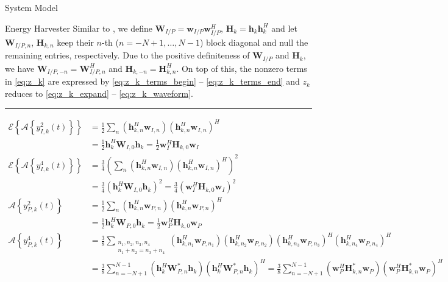 \documentclass{IEEEtran}
\begin{document}
\begin{section}{System Model}
\begin{subsection}{Energy Harvester}
		Similar to \cite{Huang2017}, we define $\boldsymbol{W}_{I/P}=\boldsymbol{w}_{I/P}\boldsymbol{w}_{I/P}^H$, $\boldsymbol{H}_k=\boldsymbol{h}_k\boldsymbol{h}_k^H$ and let $\boldsymbol{W}_{I/P,n}$, $\boldsymbol{H}_{k,n}$ keep their $n$-th ($n=-N+1,\dots,N-1$) block diagonal and null the remaining entries, respectively. Due to the positive definiteness of $\boldsymbol{W}_{I/P}$ and $\boldsymbol{H}_k$, we have $\boldsymbol{W}_{I/P,-n}=\boldsymbol{W}_{I/P,n}^H$ and $\boldsymbol{H}_{k,-n}=\boldsymbol{H}_{k,n}^H$. On top of this, the nonzero terms in \ref{eq:z_k} are expressed by \ref{eq:z_k_terms_begin} -- \ref{eq:z_k_terms_end} and $z_k$ reduces to \ref{eq:z_k_expand} -- \ref{eq:z_k_waveform}.
		\begin{figure*}[b]
			\hrule
			\begin{align}
				\mathcal{E}\left\{\mathcal{A}\left\{y_{I,k}^2(t)\right\}\right\}
				& = \frac{1}{2}\sum_n{(\boldsymbol{h}_{k,n}^H\boldsymbol{w}_{I,n})(\boldsymbol{h}_{k,n}^H\boldsymbol{w}_{I,n})^H}\label{eq:z_k_terms_begin}\\
				& = \frac{1}{2}\boldsymbol{h}_k^H\boldsymbol{W}_{I,0}\boldsymbol{h}_k = \frac{1}{2}\boldsymbol{w}_I^H\boldsymbol{H}_{k,0}\boldsymbol{w}_I\\
				\mathcal{E}\left\{\mathcal{A}\left\{y_{I,k}^4(t)\right\}\right\}
				& = \frac{3}{4}\left(\sum_n{(\boldsymbol{h}_{k,n}^H\boldsymbol{w}_{I,n})(\boldsymbol{h}_{k,n}^H\boldsymbol{w}_{I,n})^H}\right)^2\\
				& = \frac{3}{4}(\boldsymbol{h}_k^H\boldsymbol{W}_{I,0}\boldsymbol{h}_k)^2 = \frac{3}{4}(\boldsymbol{w}_I^H\boldsymbol{H}_{k,0}\boldsymbol{w}_I)^2\\
				\mathcal{A}\left\{y_{P,k}^2(t)\right\}
				& = \frac{1}{2}\sum_n{(\boldsymbol{h}_{k,n}^H\boldsymbol{w}_{P,n})(\boldsymbol{h}_{k,n}^H\boldsymbol{w}_{P,n})^H}\\
				& = \frac{1}{2}\boldsymbol{h}_k^H\boldsymbol{W}_{P,0}\boldsymbol{h}_k = \frac{1}{2}\boldsymbol{w}_P^H\boldsymbol{H}_{k,0}\boldsymbol{w}_P\\
				\mathcal{A}\left\{y_{P,k}^4(t)\right\}
				& = \frac{3}{8}\sum_{\substack{{n_1},{n_2},{n_3},{n_4}\\{n_1}+{n_2}={n_3}+{n_4}}}{(\boldsymbol{h}_{k,{n_1}}^H\boldsymbol{w}_{P,{n_1}})(\boldsymbol{h}_{k,{n_2}}^H\boldsymbol{w}_{P,{n_2}})(\boldsymbol{h}_{k,{n_3}}^H\boldsymbol{w}_{P,{n_3}})^H(\boldsymbol{h}_{k,{n_4}}^H\boldsymbol{w}_{P,{n_4}})^H}\\
				& = \frac{3}{8}\sum_{n=-N+1}^{N-1}(\boldsymbol{h}_k^H\boldsymbol{W}_{P,n}^*\boldsymbol{h}_k)(\boldsymbol{h}_k^H\boldsymbol{W}_{P,n}^*\boldsymbol{h}_k)^H = \frac{3}{8}\sum_{n=-N+1}^{N-1}(\boldsymbol{w}_P^H\boldsymbol{H}_{k,n}^*\boldsymbol{w}_P)(\boldsymbol{w}_P^H\boldsymbol{H}_{k,n}^*\boldsymbol{w}_P)^H\label{eq:z_k_terms_end}

\end{align}
\end{figure*}
\end{subsection}
\end{section}
\end{document}

